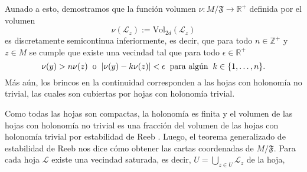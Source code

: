 \documentclass[letterpaper]{beamer}
\newtheorem{conjetura}{Conjetura}
\newcommand{\zah}{\ensuremath{ \mathbb Z }}
\newcommand{\re}{\ensuremath{\mathbb R }}
\begin{document}
\begin{frame}
  Aunado a esto, demostramos que la funci\'on volumen $\nu:M/\mathfrak{F}\rightarrow\re^{+}$ definida por el volumen
        \[
        \nu(\mathcal{L}_z):=\textrm{Vol}_{2d}(\mathcal{L}_z)
      \]
      es discretamente semicontinua inferiormente, es decir, que para todo $n\in\zah^{+}$ y $z\in M$ se cumple que existe una vecindad
      tal que para todo $\epsilon\in\re^{+}$
      \[
        \nu(y)>n\nu(z)\hspace{0.2cm}\text{o}\hspace{0.2cm}|\nu(y)-k\nu(z)|<\epsilon\hspace{0.2cm}\text{para alg\'un}\hspace{0.2cm}k\in\{1,\dots,n\}.
      \]
      M\'as a\'un, los brincos en la continuidad corresponden a las hojas con holonom\'ia no trivial, las cuales son cubiertas
      por hojas con holonom\'ia trivial.
\end{frame}
\begin{frame}
  Como todas las hojas son compactas, la holonom\'ia es finita y el volumen de las hojas
  con holonom\'ia no trivial es una fracci\'on del volumen de las hojas con holonom\'ia trivial por estabilidad de Reeb \cite{Thurston}.
  Luego, el teorema generalizado de estabilidad de Reeb \cite{Thurston} nos dice c\'omo obtener las cartas coordenadas de $M/\mathfrak{F}$.
  Para cada hoja $\mathcal{L}$ existe una vecindad saturada, es decir, $U=\bigcup_{z\in U}\mathcal{L}_z$ de la hoja,
\end{frame}
\end{document}
